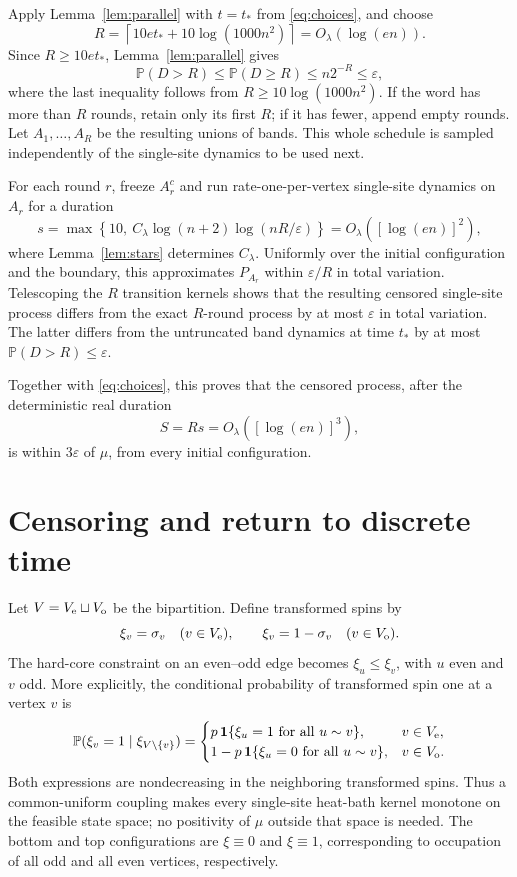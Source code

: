 \documentclass[11pt]{article}
\newcommand{\Prb}{\mathbb P}
\newcommand{\ind}{\mathbf 1}
\begin{document}
Apply Lemma~\ref{lem:parallel} with $t=t_*$ from \eqref{eq:choices}, and choose
\[
R=\left\lceil10e t_*+10\log(1000n^2)\right\rceil
=O_\lambda(\log(en)).
\]
Since $R\ge10e t_*$, Lemma~\ref{lem:parallel} gives
\[
\Prb(D>R)\le\Prb(D\ge R)\le n2^{-R}\le\varepsilon,
\]
where the last inequality follows from $R\ge10\log(1000n^2)$. If the word has more than $R$ rounds, retain only its first $R$; if it has fewer, append empty rounds. Let $A_1,\ldots,A_R$ be the resulting unions of bands. This whole schedule is sampled independently of the single-site dynamics to be used next.

For each round $r$, freeze $A_r^c$ and run rate-one-per-vertex single-site dynamics on $A_r$ for a duration
\[
s=\max\left\{10,\ C_\lambda\log(n+2)\log(nR/\varepsilon)\right\}
=O_\lambda([\log(en)]^2),
\]
where Lemma~\ref{lem:stars} determines $C_\lambda$. Uniformly over the initial configuration and the boundary, this approximates $P_{A_r}$ within $\varepsilon/R$ in total variation. Telescoping the $R$ transition kernels shows that the resulting censored single-site process differs from the exact $R$-round process by at most $\varepsilon$ in total variation. The latter differs from the untruncated band dynamics at time $t_*$ by at most $\Prb(D>R)\le\varepsilon$.

Together with \eqref{eq:choices}, this proves that the censored process, after the deterministic real duration
\begin{equation}\label{eq:real-time}
S=Rs=O_\lambda([\log(en)]^3),
\end{equation}
is within $3\varepsilon$ of $\mu$, from every initial configuration.

\section{Censoring and return to discrete time}

Let $V=V_{\rm e}\sqcup V_{\rm o}$ be the bipartition. Define transformed spins by
\[
\xi_v=\sigma_v\quad(v\in V_{\rm e}),\qquad
\xi_v=1-\sigma_v\quad(v\in V_{\rm o}).
\]
The hard-core constraint on an even--odd edge becomes $\xi_u\le\xi_v$, with $u$ even and $v$ odd. More explicitly, the conditional probability of transformed spin one at a vertex $v$ is
\[
\Prb(\xi_v=1\mid\xi_{V\setminus\{v\}})=
\begin{cases}
p\,\ind\{\xi_u=1\text{ for all }u\sim v\},&v\in V_{\rm e},\\
1-p\,\ind\{\xi_u=0\text{ for all }u\sim v\},&v\in V_{\rm o}.
\end{cases}
\]
Both expressions are nondecreasing in the neighboring transformed spins. Thus a common-uniform coupling makes every single-site heat-bath kernel monotone on the feasible state space; no positivity of $\mu$ outside that space is needed. The bottom and top configurations are $\xi\equiv0$ and $\xi\equiv1$, corresponding to occupation of all odd and all even vertices, respectively.
\end{document}
